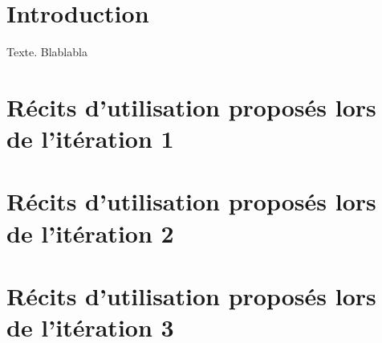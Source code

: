 \documentclass[12pt,a4paper,titlepage,openany, oneside]{report}
\begin{document}
    \renewcommand\rmdefault{pag}
    \selectfont
    \renewcommand{\sfdefault}{pag}

    \renewcommand{\contentsname}{Sommaire}
    \tableofcontents

    \chapter*{Introduction}
    \Large
    Texte. Blablabla

    \footnotesize
    \chapter{Récits d'utilisation proposés lors de l'itération 1}
    
    \newpage
    
    
    
    
    
    
    
    
    
    

    \chapter{Récits d'utilisation proposés lors de l'itération 2}
    
    \newpage
    
    
    
    
    
    
    
    
    
    

    \chapter{Récits d'utilisation proposés lors de l'itération 3}
    
    \newpage
    
    
    
    
\end{document}
